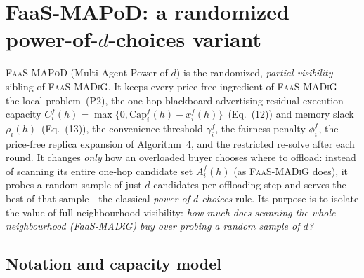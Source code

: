 
\section{FaaS-MAPoD: a randomized power-of-$d$-choices variant}
\label{sec:mapod}

\textsc{FaaS-MAPoD} (Multi-Agent Power-of-$d$) is the randomized,
\emph{partial-visibility} sibling of \textsc{FaaS-MADiG}. It keeps every
price-free ingredient of \textsc{FaaS-MADiG}---the local problem~(P2), the
one-hop blackboard advertising residual execution capacity
$C_i^f(h)=\max\{0,\mathrm{Cap}_i^f(h)-x_i^f(h)\}$~(Eq.~(12)) and memory slack
$\rho_i(h)$~(Eq.~(13)), the convenience threshold $\gamma_i^f$, the fairness
penalty $\phi_i^f$, the price-free replica expansion of Algorithm~4, and the
restricted re-solve after each round. It changes \emph{only} how an overloaded
buyer chooses where to offload: instead of scanning its entire one-hop
candidate set $A_i^f(h)$ (as \textsc{FaaS-MADiG} does), it probes a random
sample of just $d$ candidates per offloading step and serves the best of that
sample---the classical \emph{power-of-$d$-choices} rule. Its purpose is to
isolate the value of full neighbourhood visibility: \emph{how much does scanning
the whole neighbourhood (FaaS-MADiG) buy over probing a random sample of $d$?}

\subsection{Notation and capacity model}
\label{sec:mapod-notation}

